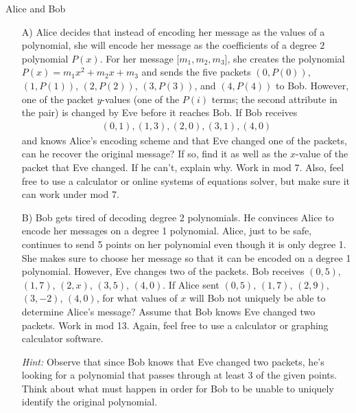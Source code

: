 \begin{homeworkProblem}{Alice and Bob}

    \begin{itemize}
        \item[A)] Alice decides that instead of encoding her message as the 
        values of a polynomial, she will encode her message as the coefficients 
        of a degree $2$ polynomial $P(x)$. For her message [$m_1, m_2, m_3$], 
        she creates the polynomial $P(x) = m_1x^2 + m_2x + m_3$ and sends the 
        five packets $(0, P(0))$, $(1, P(1))$, $(2, P(2))$, $(3, P(3))$, and 
        $(4, P(4))$ to Bob. However, one of the packet $y$-values (one of the 
        $P(i)$ terms; the second attribute in the pair) is changed by Eve before 
        it reaches Bob. If Bob receives
        \begin{align*}
            (0, 1), (1, 3), (2, 0), (3, 1), (4, 0)
        \end{align*}
        and knows Alice's encoding scheme and that Eve changed one of the 
        packets, can he recover the original message? If so, find it as well as 
        the $x$-value of the packet that Eve changed. If he can't, explain why. 
        Work in mod 7. Also, feel free to use a calculator or online systems of 
        equations solver, but make sure it can work under mod 7.
       
        \item[B)] Bob gets tired of decoding degree 2 polynomials. He convinces 
        Alice to encode her messages on a degree 1 polynomial. Alice, just to be 
        safe, continues to send 5 points on her polynomial even though it is 
        only degree 1. She makes sure to choose her message so that it can be 
        encoded on a degree 1 polynomial. However, Eve changes two of the 
        packets. Bob receives $(0, 5)$, $(1, 7)$, $(2, x)$, $(3, 5)$, $(4, 0)$. 
        If Alice sent $(0, 5)$, $(1, 7)$, $(2, 9)$, $(3, -2)$, $(4, 0)$, for 
        what values of $x$ will Bob not uniquely be able to determine Alice's 
        message? Assume that Bob knows Eve changed two packets. Work in mod 13. 
        Again, feel free to use a calculator or graphing calculator software.

        \textit{Hint:} Observe that since Bob knows that Eve changed two 
        packets, he's looking for a polynomial that passes through at least 3 of 
        the given points. Think about what must happen in order for Bob to be 
        unable to uniquely identify the original polynomial.


\end{itemize}
\end{homeworkProblem}
